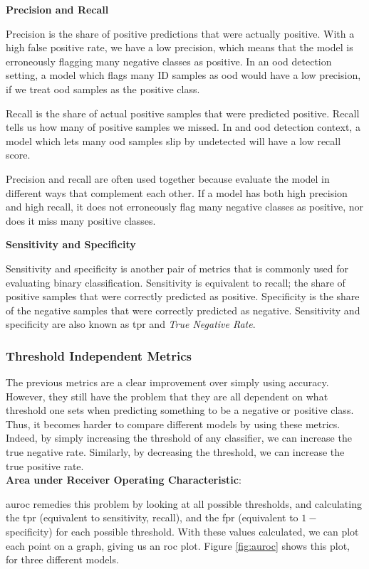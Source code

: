 \documentclass[UKenglish]{uiomasterthesis} %
\theoremstyle{definition}
\begin{document}
\noindent \textbf{Precision and Recall}

\noindent Precision is the share of positive predictions that were actually positive. With a high false positive rate, we have a low precision, which means that the model is erroneously flagging many negative classes as positive. In an \ac{ood} detection setting, a model which flags many ID samples as \ac{ood} would have a low precision, if we treat \ac{ood} samples as the positive class.

Recall is the share of actual positive samples that were predicted positive. Recall tells us how many of positive samples we missed. In and \ac{ood} detection context, a model which lets many \ac{ood} samples slip by undetected will have a low recall score.

Precision and recall are often used together because evaluate the model in different ways that complement each other. If a model has both high precision and high recall, it does not erroneously flag many negative classes as positive, nor does it miss many positive classes.

\noindent \textbf{Sensitivity and Specificity}

\noindent Sensitivity and specificity is another pair of metrics that is commonly used for evaluating binary classification. Sensitivity is equivalent to recall; the share of positive samples that were correctly predicted as positive. Specificity is the share of the negative samples that were correctly predicted as negative. Sensitivity and specificity are also known as \ac{tpr} and {\it True Negative Rate}.

\subsubsection{Threshold Independent Metrics}

The previous metrics are a clear improvement over simply using accuracy. However, they still have the problem that they are all dependent on what threshold one sets when predicting something to be a negative or positive class. Thus, it becomes harder to compare different models by using these metrics. Indeed, by simply increasing the threshold of any classifier, we can increase the true negative rate. Similarly, by decreasing the threshold, we can increase the true positive rate.\\

\noindent \textbf{Area under Receiver Operating Characteristic}:

\noindent \ac{auroc} remedies this problem by looking at all possible thresholds, and calculating the \ac{tpr} (equivalent to sensitivity, recall), and the \ac{fpr} (equivalent to $1 -$ specificity) for each possible threshold. With these values calculated, we can plot each point on a graph, giving us an \ac{roc} plot. Figure \ref{fig:auroc} shows this plot, for three different models.
\end{document}
